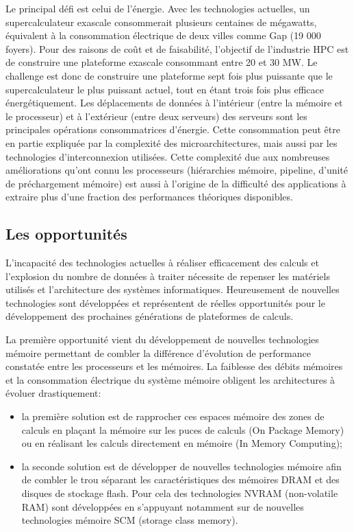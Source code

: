         Le principal défi est celui de l'énergie. Avec les technologies actuelles, un supercalculateur exascale consommerait plusieurs centaines de mégawatts, équivalent à la consommation électrique de deux villes comme Gap (19 000 foyers). Pour des raisons de coût et de faisabilité, l'objectif de l'industrie HPC est de construire une plateforme exascale consommant entre 20 et 30 MW. Le challenge est donc de construire une plateforme sept fois plus puissante que le supercalculateur le plus puissant actuel, tout en étant trois fois plus efficace énergétiquement. Les déplacements de données à l'intérieur (entre la mémoire et le processeur) et à l'extérieur (entre deux serveurs) des serveurs sont les principales opérations consommatrices d'énergie. Cette consommation peut être en partie expliquée par la complexité des microarchitectures, mais aussi par les technologies d'interconnexion utilisées. Cette complexité due aux nombreuses améliorations qu'ont connu les processeurs (hiérarchies mémoire, pipeline, d'unité de préchargement mémoire) est aussi à l'origine de la difficulté des applications à extraire plus d'une fraction des performances théoriques disponibles.
        

    \subsection{Les opportunités}


        L'incapacité des technologies actuelles à réaliser efficacement des calculs et l'explosion du nombre de données à traiter nécessite de repenser les matériels utilisés et l'architecture des systèmes informatiques. Heureusement de nouvelles technologies sont développées et représentent de réelles opportunités pour le développement des prochaines générations de plateformes de calculs.
        
        La première opportunité vient du développement de nouvelles technologies mémoire permettant de combler la différence d'évolution de performance constatée entre les processeurs et les mémoires. La faiblesse des débits mémoires et la consommation électrique du système mémoire obligent les architectures à évoluer drastiquement: 
        \begin{itemize}
            \item la première solution est de rapprocher ces espaces mémoire des zones de calculs en plaçant la mémoire sur les puces de calculs (On Package Memory) ou en réalisant les calculs directement en mémoire (In Memory Computing); 
            \item la seconde solution est de développer de nouvelles technologies mémoire afin de combler le trou séparant les caractéristiques des mémoires DRAM et des disques de stockage flash. Pour cela des technologies NVRAM (non-volatile RAM) sont développées en s'appuyant notamment sur de nouvelles technologies mémoire SCM (storage class memory).
        \end{itemize}
        
